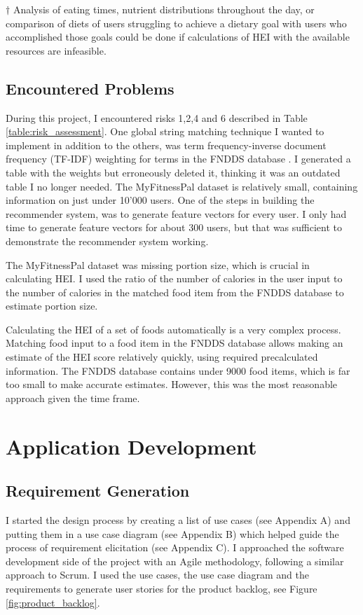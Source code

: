 \documentclass{article}
\begin{document}
\bigskip
\noindent $\dagger$ Analysis of eating times, nutrient distributions throughout the day, or comparison of diets of users struggling to achieve a dietary goal with users who accomplished those goals could be done if calculations of HEI with the available resources are infeasible. 

\subsection{Encountered Problems}
During this project, I encountered risks 1,2,4 and 6 described in Table \ref{table:risk_assessment}. One global string matching technique I wanted to implement in addition to the others, was term frequency-inverse document frequency (TF-IDF) weighting for terms in the FNDDS database \cite{FNDDS}. I generated a table with the weights but erroneously deleted it, thinking it was an outdated table I no longer needed. 
\bigskip
\noindent The MyFitnessPal dataset \cite{diet_success_predictions} is relatively small, containing information on just under 10'000 users. One of the steps in building the recommender system, was to generate feature vectors for every user. I only had time to generate feature vectors for about 300 users, but that was sufficient to demonstrate the recommender system working.

\bigskip
\noindent The MyFitnessPal dataset was missing portion size, which is crucial in calculating HEI. I used the ratio of the number of calories in the user input to the number of calories in the matched food item from the FNDDS database to estimate portion size.

\bigskip
\noindent Calculating the HEI of a set of foods automatically is a very complex process. Matching food input to a food item in the FNDDS database allows making an estimate of the HEI score relatively quickly, using required precalculated information. The FNDDS database contains under 9000 food items, which is far too small to make accurate estimates. However, this was the most reasonable approach given the time frame. 



\newpage
\section{Application Development}
\subsection{Requirement Generation}
I started the design process by creating a list of use cases (see Appendix A) and putting them in a use case diagram (see Appendix B) which helped guide the process of requirement elicitation (see Appendix C). I approached the software development side of the project with an Agile methodology, following a similar approach to Scrum. I used the use cases, the use case diagram and the requirements to generate user stories for the product backlog, see Figure \ref{fig:product_backlog}.
\end{document}
